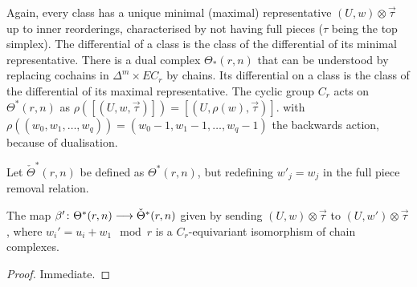 Again, every class has a unique minimal (maximal) representative $(U,w)\otimes \vec{\tau}$ up to inner reorderings, characterised by not having full pieces ($\tau$ being the top simplex). The differential of a class is the class of the differential of its minimal representative. There is a dual complex $\Theta_*(r,n)$ that can be understood by replacing cochains in $\Delta^m\times EC_r$ by chains. Its differential on a class is the class of the differential of its maximal representative. The cyclic group $C_r$ acts on $\Theta^*(r,n)$ as $\rho([(U,w,\vec{\tau})]) = [(U,\rho(w),\vec{\tau})]$. with $\rho((w_0,w_1,\ldots,w_q)) = (w_0-1,w_1-1,\ldots,w_q-1)$ the backwards action, because of dualisation.



\begin{definition} Let $\check{\Theta}^*(r,n)$ be defined as $\Theta^*(r,n)$, but redefining $w'_j = w_j$ in the full piece removal relation.
\end{definition}
\begin{lemma}
	The map $\beta'\colon \Theta^*(r,n)\longrightarrow \check{\Theta}^*(r,n)$ given by sending $(U,w)\otimes \vec{\tau}$ to $(U,w')\otimes \vec{\tau}$, where $w_i' = u_i+w_1\mod r$ is a $C_r$-equivariant isomorphism of chain complexes.
\end{lemma}
\begin{proof} Immediate.
\end{proof}

